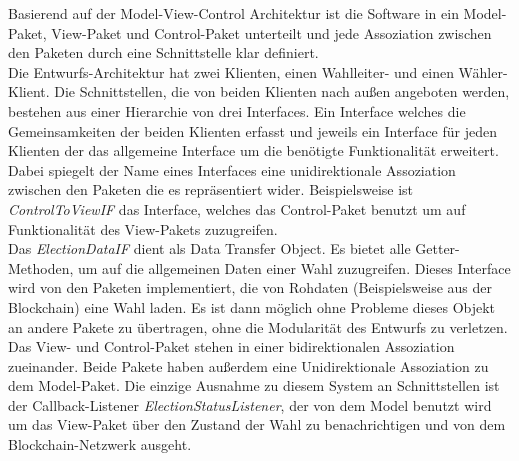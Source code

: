 \documentclass[parskip=full]{scrartcl}
\newcommand{\textitx}[1]{\mbox{\textit{#1}}}
\begin{document}
	Basierend auf der Model-View-Control Architektur ist die Software in ein Model-Paket, View-Paket und Control-Paket unterteilt und jede Assoziation zwischen den Paketen durch eine Schnittstelle klar definiert. 
	\\
	Die Entwurfs-Architektur hat zwei Klienten, einen Wahlleiter- und einen Wähler-Klient. Die Schnittstellen, die von beiden Klienten nach außen angeboten werden, bestehen aus einer Hierarchie von drei Interfaces. Ein Interface welches die Gemeinsamkeiten der beiden Klienten erfasst und jeweils ein Interface für jeden Klienten der das allgemeine Interface um die benötigte Funktionalität erweitert. Dabei spiegelt der Name eines Interfaces eine unidirektionale Assoziation zwischen den Paketen die es repräsentiert wider. Beispielsweise ist \textitx{ControlToViewIF} das Interface, welches das Control-Paket benutzt um auf Funktionalität des View-Pakets zuzugreifen.
	\\
	Das \textitx{ElectionDataIF} dient als Data Transfer Object. Es bietet alle Getter-Methoden, um auf die allgemeinen Daten einer Wahl zuzugreifen. Dieses Interface wird von den Paketen implementiert, die von Rohdaten (Beispielsweise aus der Blockchain) eine Wahl laden. Es ist dann möglich ohne Probleme dieses Objekt an andere Pakete zu übertragen, ohne die Modularität des Entwurfs zu verletzen.
	\\
	Das View- und Control-Paket stehen in einer bidirektionalen Assoziation zueinander. Beide Pakete haben außerdem eine Unidirektionale Assoziation zu dem Model-Paket. Die einzige Ausnahme zu diesem System an Schnittstellen ist der Callback-Listener \textit{ElectionStatusListener}, der von dem Model benutzt wird um das View-Paket über den Zustand der Wahl zu benachrichtigen und von dem Blockchain-Netzwerk ausgeht.
	\\
\end{document}
